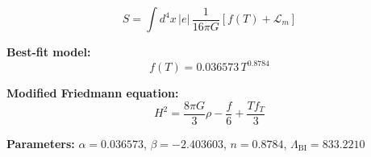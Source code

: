 
\begin{equation}
  S = \int d^4x \, |e| \, \frac{1}{16\pi G} \left[ f(T) + \mathcal{L}_m \right]
\end{equation}

\textbf{Best-fit model:}
\begin{equation}
  f(T) = 0.036573 \, T^{0.8784}
\end{equation}

\textbf{Modified Friedmann equation:}
\begin{equation}
  H^2 = \frac{8\pi G}{3} \rho - \frac{f}{6} + \frac{T f_T}{3}
\end{equation}

\textbf{Parameters:}
$\alpha = 0.036573$, \quad
$\beta = -2.403603$, \quad
$n = 0.8784$, \quad
$\Lambda_{\text{BI}} = 833.2210$
